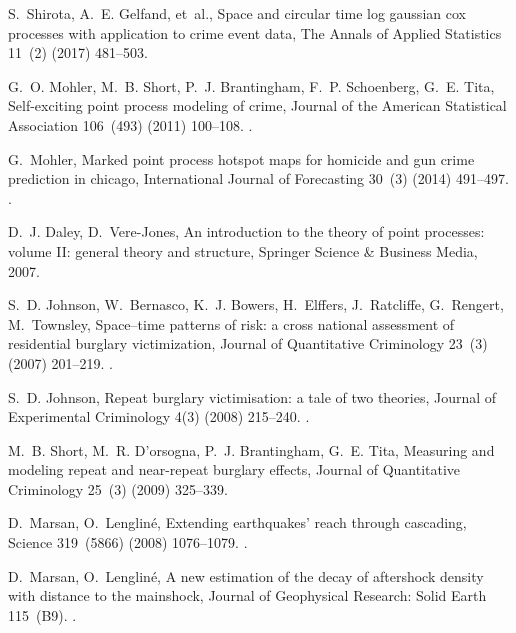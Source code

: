 \documentclass[review]{elsarticle}
\begin{document}
\begin{thebibliography}{10}
S.~Shirota, A.~E. Gelfand, et~al., Space and circular time log gaussian cox
  processes with application to crime event data, The Annals of Applied
  Statistics 11~(2) (2017) 481--503.

G.~O. Mohler, M.~B. Short, P.~J. Brantingham, F.~P. Schoenberg, G.~E. Tita,
  Self-exciting point process modeling of crime, Journal of the American
  Statistical Association 106~(493) (2011) 100--108.
\newblock \href {http://dx.doi.org/10.1198/jasa.2011.ap09546}
  {}.

G.~Mohler, Marked point process hotspot maps for homicide and gun crime
  prediction in chicago, International Journal of Forecasting 30~(3) (2014)
  491--497.
\newblock \href {http://dx.doi.org/10.1016/j.ijforecast.2014.01.004}
  {}.

D.~J. Daley, D.~Vere-Jones, An introduction to the theory of point processes:
  volume II: general theory and structure, Springer Science \& Business Media,
  2007.

S.~D. Johnson, W.~Bernasco, K.~J. Bowers, H.~Elffers, J.~Ratcliffe, G.~Rengert,
  M.~Townsley, Space--time patterns of risk: a cross national assessment of
  residential burglary victimization, Journal of Quantitative Criminology
  23~(3) (2007) 201--219.
\newblock \href {http://dx.doi.org/10.1007/s10940-007-9025-3}
  {}.

S.~D. Johnson, Repeat burglary victimisation: a tale of two theories, Journal
  of Experimental Criminology 4(3) (2008) 215--240.
\newblock \href {http://dx.doi.org/10.1007/s11292-008-9055-3}
  {}.

M.~B. Short, M.~R. D’orsogna, P.~J. Brantingham, G.~E. Tita, Measuring and
  modeling repeat and near-repeat burglary effects, Journal of Quantitative
  Criminology 25~(3) (2009) 325--339.
\newblock \href {http://dx.doi.org/10.1007/s10940-009-9068-8.}
  {}

D.~Marsan, O.~Lenglin{\'e}, Extending earthquakes' reach through cascading,
  Science 319~(5866) (2008) 1076--1079.
\newblock \href {http://dx.doi.org/10.1126/science.1148783}
  {}.

D.~Marsan, O.~Lenglin{\'e}, A new estimation of the decay of aftershock density
  with distance to the mainshock, Journal of Geophysical Research: Solid Earth
  115~(B9).
\newblock \href {http://dx.doi.org/10.1029/2009JB007119}
  {}.


\end{thebibliography}
\end{document}
